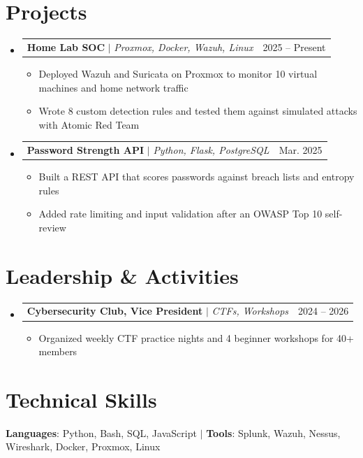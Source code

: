 \documentclass[letterpaper,11pt]{article}
\makeatletter
\newcommand{\resumeItem}[1]{
  \item\small{
    {#1 \vspace{-2pt}}
  }
}
\newcommand{\resumeProjectHeading}[2]{
    \item
    \begin{tabular*}{0.97\textwidth}{l@{\extracolsep{\fill}}r}
      \small#1 & #2 \\
    \end{tabular*}\vspace{-7pt}
}
\newcommand{\resumeSubHeadingListStart}{\begin{itemize}[leftmargin=0.15in, label={}]}
\newcommand{\resumeSubHeadingListEnd}{\end{itemize}}
\newcommand{\resumeItemListStart}{\begin{itemize}[label=$\bullet$]}
\newcommand{\resumeItemListEnd}{\end{itemize}\vspace{-5pt}}
\makeatother
\begin{document}
\section{Projects}
    \resumeSubHeadingListStart
      \resumeProjectHeading
          {\textbf{Home Lab SOC} $|$ \emph{Proxmox, Docker, Wazuh, Linux}}{2025 -- Present}
          \resumeItemListStart
            \resumeItem{Deployed Wazuh and Suricata on Proxmox to monitor 10 virtual machines and home network traffic}
            \resumeItem{Wrote 8 custom detection rules and tested them against simulated attacks with Atomic Red Team}
          \resumeItemListEnd
      \resumeProjectHeading
          {\textbf{Password Strength API} $|$ \emph{Python, Flask, PostgreSQL}}{Mar. 2025}
          \resumeItemListStart
            \resumeItem{Built a REST API that scores passwords against breach lists and entropy rules}
            \resumeItem{Added rate limiting and input validation after an OWASP Top 10 self-review}
          \resumeItemListEnd
    \resumeSubHeadingListEnd

\section{Leadership \& Activities}
\resumeSubHeadingListStart
      \resumeProjectHeading
          {\textbf{Cybersecurity Club, Vice President} $|$ \emph{CTFs, Workshops}}{2024 -- 2026}
          \resumeItemListStart
            \resumeItem{Organized weekly CTF practice nights and 4 beginner workshops for 40+ members}
          \resumeItemListEnd
    \resumeSubHeadingListEnd

\section{Technical Skills}
 \begin{itemize}[leftmargin=0.15in, label={}]
    \small{\item{
     \textbf{Languages}{: Python, Bash, SQL, JavaScript} \quad $|$ \quad \textbf{Tools}{: Splunk, Wazuh, Nessus, Wireshark, Docker, Proxmox, Linux}
    }}
 \end{itemize}

\end{document}
